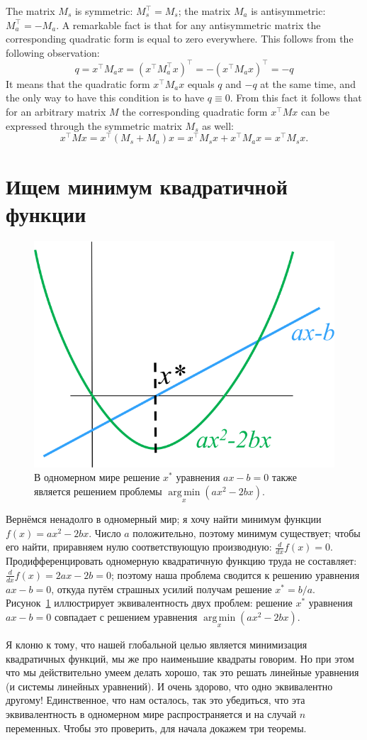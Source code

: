 \documentclass[notitlepage]{report}
\DeclareMathOperator*{\argmin}{arg\,min}
\begin{document}
The matrix $M_s$ is symmetric: $M_s^\top = M_s$; the matrix $M_a$ is antisymmetric: $M_a^\top=-M_a$.
A remarkable fact is that for any antisymmetric matrix the corresponding quadratic form is equal to zero everywhere. This follows from the following observation:
$$
q = x^\top M_a x  = (x^\top M_a^\top x)^\top = - (x^\top M_a x)^\top = -q
$$
It means that the quadratic form $x^\top M_a x$ equals $q$ and $-q$ at the same time, and the only way to have this condition is to have $q\equiv 0$.
From this fact it follows that for an arbitrary matrix $M$ the corresponding quadratic form $x^\top M x$ can be expressed through the symmetric matrix $M_s$ as well:
$$
x^\top M x = x^\top (M_s + M_a) x = x^\top M_s x  + x^\top M_a x = x^\top M_s x.
$$


\section{Ищем минимум квадратичной функции}

\begin{figure}[ht]
	\centering
	\includegraphics[width=.3\linewidth]{minpb1d}
	\caption{В одномерном мире решение $x^*$ уравнения $ax - b = 0$ также является решением проблемы $\argmin\limits_x(ax^2-2bx)$. }
	\label{fig:min1d}
\end{figure}

Вернёмся ненадолго в одномерный мир; я хочу найти минимум функции $f(x) = ax^2 - 2bx$. Число $a$ положительно, поэтому минимум существует; чтобы его найти, приравняем нулю соответствующую производную: $\frac{d}{dx}f(x) = 0$. Продифференцировать одномерную квадратичную функцию труда не составляет: $\frac{d}{dx}f(x) = 2ax - 2b = 0$; поэтому наша проблема сводится к решению уравнения $ax-b=0$, откуда
путём страшных усилий получам решение $x^* = b/a$. Рисунок~\ref{fig:min1d} иллюстрирует эквивалентность двух проблем: решение $x^*$ уравнения $ax-b=0$ совпадает с решением уравнения $\argmin\limits_x(ax^2 - 2bx)$.

Я клоню к тому, что нашей глобальной целью является минимизация квадратичных функций, мы же про наименьшие квадраты говорим. Но при этом что мы действительно умеем делать хорошо, так это решать линейные уравнения (и системы линейных уравнений). И очень здорово, что одно эквивалентно другому!
Единственное, что нам осталось, так это убедиться, что эта эквивалентность в одномерном мире распространяется и на случай $n$ переменных. Чтобы это проверить, для начала докажем три теоремы.
\end{document}
